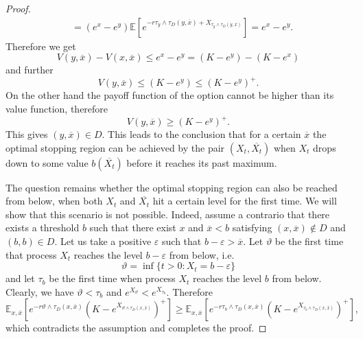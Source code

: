 \documentclass[10pt]{amsart}
\def\E{{\mathbb{E}}}
\def \R{{{\rm I{\!}\rm R}}}
\def\E{{\mathbb E}} \def\PP{\mc P} \def\Z{{\mathbb Z}} \def\R{{\mathbb R}}
\begin{document}
\begin{proof}
\begin{align*}
			& = (e^x - e^y)\E[e^{-r\tau_y\wedge\tau_D(y,\overline{x}) + X_{\tau_y\wedge\tau_D(y,\overline{x})}}] = e^x - e^y.
		\end{align*}
		Therefore we get
		\begin{equation*}
			V(y, \overline{x}) - V(x, \overline{x}) \leq  e^x - e^y = (K - e^y) - (K-e^x)
		\end{equation*}
		and further
		\begin{equation*}
			V(y, \overline{x}) \leq (K - e^y) \leq  (K - e^y)^+.
		\end{equation*}
		On the other hand the payoff function of the option cannot be higher than its value function, therefore
		\begin{equation*}
			V(y, \overline{x}) \geq  (K - e^y)^+.
		\end{equation*}
		This gives $(y, \overline{x}) \in D$. This leads to the conclusion that for a certain $\overline{x}$ the optimal stopping region can be achieved by the pair $(X_t, \overline{X_t})$ when $X_t$ drops down to some value $b(\overline{X_t})$ before it reaches its past maximum.
		
		The question remains whether the optimal stopping region can also be reached from below, when both $X_t$ and $\overline{X_t}$ hit a certain level for the first time. We will show that this scenario is not possible.
		Indeed, assume a contrario that there exists a threshold $b$ such that there exist $x$ and  $\overline{x} < b$ satisfying $(x, \overline{x}) \notin D$ and $(b,b) \in D$. Let us take a positive $\varepsilon$ such that $b - \varepsilon > \overline{x}$. Let $\vartheta$ be the first time that process $X_t$ reaches the level $b - \varepsilon$ from below, i.e.
		\begin{equation*}
			\vartheta = \inf \{ t > 0: X_t = b - \varepsilon \}
		\end{equation*}
		and let $\tau_b$ be the first time when process $X_t$  reaches the level $b$ from below. Clearly, we have $\vartheta < \tau_b$ and $e^{X_\vartheta} < e^{X_{\tau_b}}.$ Therefore
		\begin{equation*}
			\E_{x,\overline{x}}[e^{-r\vartheta\wedge\tau_D(x,\overline{x})}(K - e^{X_{\vartheta\wedge\tau_D(x,\overline{x})}})^+] \geq \E_{x,\overline{x}}[e^{-r\tau_b\wedge\tau_D(x,\overline{x})}(K - e^{X_{\tau_b\wedge\tau_D(x,\overline{x})}})^+],
		\end{equation*}
		which contradicts the assumption and completes the proof.
		
	\end{proof}
	
\end{document}
